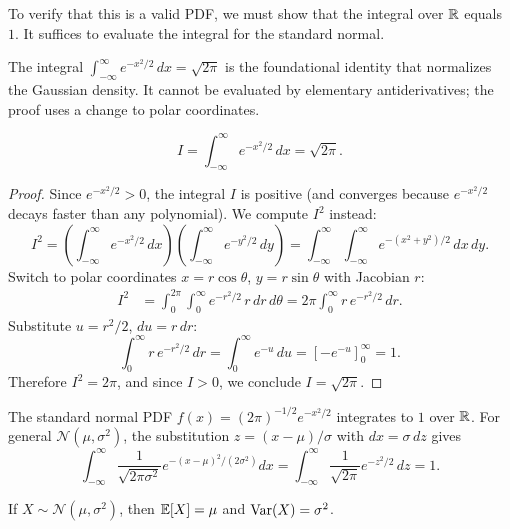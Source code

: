 \documentclass[11pt,a4paper]{article}
\begin{document}
To verify that this is a valid PDF, we must show that the integral over
$\mathbb{R}$ equals $1$. It suffices to evaluate the integral for the standard
normal.

\begin{keyresult}[title={The Gaussian Integral}]
The integral $\int_{-\infty}^{\infty} e^{-x^2/2}\,dx = \sqrt{2\pi}$
is the foundational identity that normalizes the Gaussian density. It
cannot be evaluated by elementary antiderivatives; the proof uses a
change to polar coordinates.
\end{keyresult}

\begin{theorem}
\label{thm:gaussian_integral}
\[
    I = \int_{-\infty}^{\infty} e^{-x^2/2} \, dx = \sqrt{2\pi}.
\]
\end{theorem}

\begin{proof}
Since $e^{-x^2/2} > 0$, the integral $I$ is positive (and converges
because $e^{-x^2/2}$ decays faster than any polynomial). We compute
$I^2$ instead:
\[
    I^2 = \left(\int_{-\infty}^{\infty} e^{-x^2/2} \, dx\right)
    \left(\int_{-\infty}^{\infty} e^{-y^2/2} \, dy\right)
    = \int_{-\infty}^{\infty} \int_{-\infty}^{\infty}
    e^{-(x^2 + y^2)/2} \, dx \, dy.
\]
Switch to polar coordinates $x = r\cos\theta$, $y = r\sin\theta$ with
Jacobian $r$:
\begin{align*}
    I^2 &= \int_0^{2\pi} \int_0^{\infty} e^{-r^2/2} \, r \, dr \, d\theta
    = 2\pi \int_0^{\infty} r \, e^{-r^2/2} \, dr.
\end{align*}
Substitute $u = r^2/2$, $du = r\,dr$:
\[
    \int_0^{\infty} r \, e^{-r^2/2} \, dr
    = \int_0^{\infty} e^{-u} \, du
    = \left[-e^{-u}\right]_0^{\infty} = 1.
\]
Therefore $I^2 = 2\pi$, and since $I > 0$, we conclude
$I = \sqrt{2\pi}$.
\end{proof}

\begin{corollary}
\label{cor:normal_valid}
The standard normal PDF $f(x) = (2\pi)^{-1/2} e^{-x^2/2}$ integrates
to $1$ over $\mathbb{R}$. For general $\mathcal{N}(\mu, \sigma^2)$, the
substitution $z = (x - \mu)/\sigma$ with $dx = \sigma \, dz$ gives
\[
    \int_{-\infty}^{\infty} \frac{1}{\sqrt{2\pi\sigma^2}}
    e^{-(x-\mu)^2/(2\sigma^2)} dx
    = \int_{-\infty}^{\infty} \frac{1}{\sqrt{2\pi}} e^{-z^2/2} \, dz
    = 1.
\]
\end{corollary}

\begin{theorem}
\label{thm:normal_moments}
If $X \sim \mathcal{N}(\mu, \sigma^2)$, then $\mathbb{E}[X] = \mu$ and
$\operatorname{Var}(X) = \sigma^2$.
\end{theorem}
\end{document}

